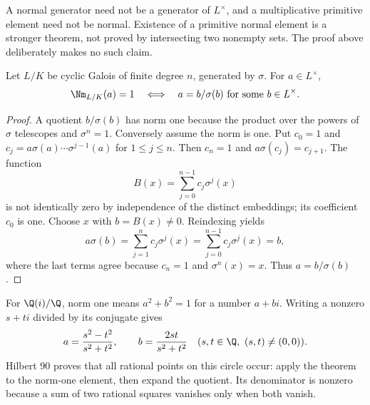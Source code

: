 \begin{remark}
A normal generator need not be a generator of $L^\times$, and a multiplicative primitive element need not be normal. Existence of a primitive normal element is a stronger theorem, not proved by intersecting two nonempty sets. The proof above deliberately makes no such claim.
\end{remark}

\begin{theorem}
Let $L/K$ be cyclic Galois of finite degree $n$, generated by $\sigma$. For $a\in L^\times$,
\[\Nm_{L/K}(a)=1\quad\Longleftrightarrow\quad a=b/\sigma(b)\text{ for some }b\in L^\times.\]
\end{theorem}
\begin{proof}
A quotient $b/\sigma(b)$ has norm one because the product over the powers of $\sigma$ telescopes and $\sigma^n=1$. Conversely assume the norm is one. Put $c_0=1$ and $c_j=a\sigma(a)\cdots\sigma^{j-1}(a)$ for $1\leq j\leq n$. Then $c_n=1$ and $a\sigma(c_j)=c_{j+1}$. The function
\[B(x)=\sum_{j=0}^{n-1}c_j\sigma^j(x)\]
is not identically zero by independence of the distinct embeddings; its coefficient $c_0$ is one. Choose $x$ with $b=B(x)\ne0$. Reindexing yields
\[a\sigma(b)=\sum_{j=1}^n c_j\sigma^j(x)=\sum_{j=0}^{n-1}c_j\sigma^j(x)=b,\]
where the last terms agree because $c_n=1$ and $\sigma^n(x)=x$. Thus $a=b/\sigma(b)$.
\end{proof}
\begin{example}
For $\Q(i)/\Q$, norm one means $a^2+b^2=1$ for a number $a+bi$. Writing a nonzero $s+ti$ divided by its conjugate gives
\[a=\frac{s^2-t^2}{s^2+t^2},\qquad b=\frac{2st}{s^2+t^2}\quad(s,t\in\Q,\ (s,t)\ne(0,0)).\]
Hilbert 90 proves that all rational points on this circle occur: apply the theorem to the norm-one element, then expand the quotient. Its denominator is nonzero because a sum of two rational squares vanishes only when both vanish.
\end{example}

